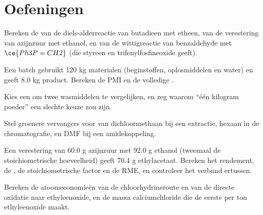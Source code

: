 \section{Oefeningen}

\begin{exercise}[$\star$]\label{exo:b3:green-industrial:1}
Bereken de  van de diels-alderreactie van butadieen met
etheen, van de verestering van azijnzuur met ethanol, en van de
wittigreactie van benzaldehyde met $\ce{Ph3P=CH2}$ (die styreen en trifenylfosfineoxide geeft).
\end{exercise}

\begin{exercise}[$\star$]\label{exo:b3:green-industrial:2}
Een batch gebruikt 120 kg materialen (beginstoffen, oplosmiddelen en
water) en geeft 8.0 kg product. Bereken de PMI en de volledige .
\end{exercise}

\begin{exercise}[$\star$]\label{exo:b3:green-industrial:3}
Kies een  om twee wasmiddelen te vergelijken, en zeg
waarom ``één kilogram poeder'' een slechte keuze zou zijn.
\end{exercise}

\begin{exercise}[$\star$]\label{exo:b3:green-industrial:4}
Stel groenere vervangers voor van dichloormethaan bij een extractie,
hexaan in de chromatografie, en DMF bij een amidekoppeling.
\end{exercise}

\begin{exercise}[$\star\star$]\label{exo:b3:green-industrial:5}
Een verestering van 60.0 g azijnzuur met 92.0 g ethanol (tweemaal de
stoichiometrische hoeveelheid) geeft 70.4 g ethylacetaat. Bereken het
rendement, de , de stoichiometrische factor en de RME, en
controleer het verband ertussen.
\end{exercise}

\begin{exercise}[$\star\star$]\label{exo:b3:green-industrial:6}
Bereken de atoomeconomieën van de chloorhydrineroute en van de directe
oxidatie naar ethyleenoxide, en de massa calciumchloride die de eerste
per ton ethyleenoxide maakt.
\end{exercise}

